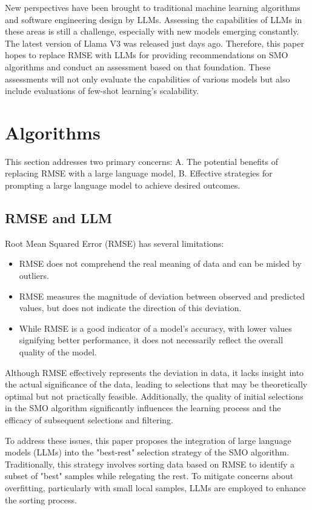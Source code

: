 \documentclass{ieeeaccess}
\begin{document}
New perspectives have been brought to traditional machine learning algorithms and software engineering design by LLMs. Assessing the capabilities of LLMs in these areas is still a challenge, especially with new models emerging constantly. The latest version of Llama V3 was released just days ago. Therefore, this paper hopes to replace RMSE with LLMs for providing recommendations on SMO algorithms and conduct an assessment based on that foundation. These assessments will not only evaluate the capabilities of various models but also include evaluations of few-shot learning's scalability.

\section{Algorithms}
\label{sec:algorithms}

This section addresses two primary concerns:
A. The potential benefits of replacing RMSE with a large language model,
B. Effective strategies for prompting a large language model to achieve desired outcomes.

\subsection{RMSE and LLM}
Root Mean Squared Error (RMSE) has several limitations:
\begin{itemize}
\item RMSE does not comprehend the real meaning of data and can be misled by outliers.
\item RMSE measures the magnitude of deviation between observed and predicted values, but does not indicate the direction of this deviation.
\item While RMSE is a good indicator of a model's accuracy, with lower values signifying better performance, it does not necessarily reflect the overall quality of the model.
\end{itemize}
Although RMSE effectively represents the deviation in data, it lacks insight into the actual significance of the data, leading to selections that may be theoretically optimal but not practically feasible. Additionally, the quality of initial selections in the SMO algorithm significantly influences the learning process and the efficacy of subsequent selections and filtering.

To address these issues, this paper proposes the integration of large language models (LLMs) into the "best-rest" selection strategy of the SMO algorithm. Traditionally, this strategy involves sorting data based on RMSE to identify a subset of "best" samples while relegating the rest. To mitigate concerns about overfitting, particularly with small local samples, LLMs are employed to enhance the sorting process.
\end{document}

